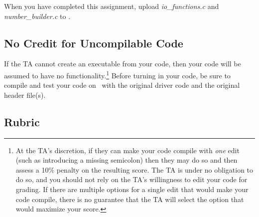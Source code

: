 When you have completed this assignment, upload \textit{io\_functions.c} and \textit{number\_builder.c} to
\filesubmission.

\subsection*{No Credit for Uncompilable Code}
If the TA cannot create an executable from your code, then your code will be assumed to have no functionality.\footnote{
    At the TA's discretion, if they can make your code compile with \textit{one} edit (such as introducing a missing semicolon) then they may do so and then assess a 10\% penalty on the resulting score.
    The TA is under no obligation to do so, and you should not rely on the TA's willingness to edit your code for grading.
    If there are multiple options for a single edit that would make your code compile, there is no guarantee that the TA will select the option that would maximize your score.
}
Before turning in your code, be sure to compile and test your code on \runtimeenvironment\ with the original driver code and the original header file(s).

\pollinglablatepolicy

\subsection*{Rubric}

